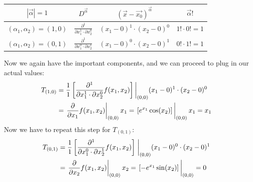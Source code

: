 \documentclass{article}
\begin{document}
	\begin{table}[h!]
		\centering
		\renewcommand{\arraystretch}{1.5} 
		\begin{tabular}{cccc}
			\hline
			$|\vec{\alpha}|=1$ & $D^{\vec{\alpha}}$ & $\left(\vec{x}-\vec{x_0}\right)^{\vec{\alpha}}$& $\vec{\alpha}!$\\
			\hline
			$(\alpha_1, \alpha_2)=(1, 0)$&$\frac{\partial^1}{\partial x_1^{1}\cdot \partial x_2^{0}}$& $(x_1-0)^1\cdot(x_2-0)^0$ & $1!\cdot 0! = 1$\\
			$(\alpha_1, \alpha_2)=(0, 1)$&$\frac{\partial^1}{\partial x_1^{0}\cdot \partial x_2^{1}}$& $(x_1-0)^0\cdot(x_2-0)^1$ &$0!\cdot 1! = 1$
		\end{tabular}
		\label{tab:taylor_example_2}
	\end{table}
	Now we again have the important components, and we can proceed to plug in our actual values: 
	\begin{align}
		T_{(1,0)}&=\frac{1}{1}\left[\frac{\partial^1}{\partial x_1^{1}\cdot \partial x_2^{0}}f(x_1, x_2)\right]\bigg{|}_{(0,0)}(x_1-0)^1\cdot(x_2-0)^0\\
		&=\eval{\frac{\partial}{\partial x_1}f(x_1,x_2)}_{(0,0)}x_1= \eval{\left[e^{x_1} \cos(x_2)\right]}_{(0,0)}x_1= x_1
	\end{align}
	Now we have to repeat this step for $T_{(0,1)}$:
	\begin{align}
		T_{(0,1)}&=\frac{1}{1}\left[\frac{\partial^1}{\partial x_1^{0}\cdot \partial x_2^{1}}f(x_1, x_2)\right]\eval_{(0,0)}(x_1-0)^0\cdot(x_2-0)^1\\
		&=\eval{\frac{\partial}{\partial x_2}f(x_1,x_2)}_{(0,0)}x_2= \eval{\left[-e^{x_1} \sin(x_2)\right]}_{(0,0)}= 0
	\end{align}
	
\end{document}

